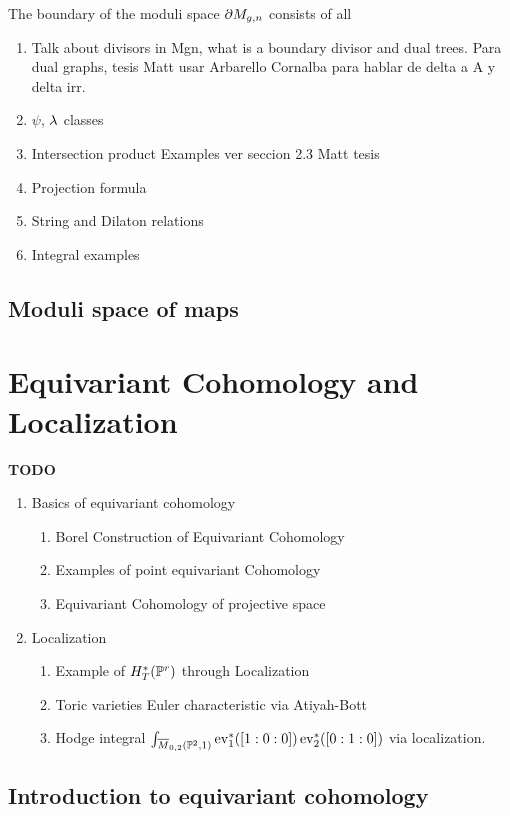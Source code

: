 \documentclass[12pt]{memoir}
\begin{document}
\begin{Def}
    The boundary of the moduli space $\partial M_{g,n}$ consists of all 
\end{Def}
\begin{enumerate}
    \item Talk about divisors in Mgn, what is a boundary divisor and dual trees. Para dual graphs, tesis Matt usar Arbarello Cornalba para hablar de delta a A y delta irr.
    \item $\psi$, $\lambda$ classes
    \item Intersection product Examples ver seccion 2.3 Matt tesis
    \item Projection formula
    \item String and Dilaton relations
    \item Integral examples
\end{enumerate}

\section{Moduli space of maps}

\chapter{Equivariant Cohomology and Localization}

\textbf{TODO}
\begin{enumerate}
    \item Basics of equivariant cohomology
 \begin{enumerate}
    \item Borel Construction of Equivariant Cohomology
    \item Examples of point equivariant Cohomology
    \item Equivariant Cohomology of projective space
\end{enumerate}
\item Localization
\begin{enumerate}
    \item Example of $H^\ast_T(\mathbb{P}^r)$ through Localization
    \item Toric varieties Euler characteristic via Atiyah-Bott
    \item Hodge integral $\int_{\overline M_{0,2}(\mathbb{P}^2,1)}\operatorname{ev}_1^\ast([1:0:0])\operatorname{ev}_2^\ast([0:1:0])$ via localization.
\end{enumerate}
\end{enumerate}


\section{Introduction to equivariant cohomology}
\end{document}
